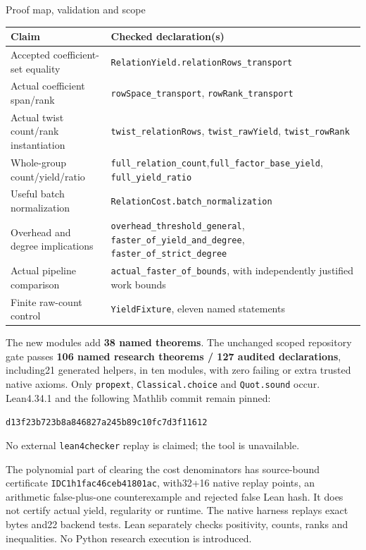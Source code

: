 \documentclass[10pt]{article}
\begin{document}
\newpage
\begin{center}{\Large Proof map, validation and scope}\end{center}
\begin{tabular}{p{.37\linewidth}p{.58\linewidth}}
\toprule
Claim & Checked declaration(s)\\\midrule
Accepted coefficient-set equality & \texttt{RelationYield.relationRows\_transport}\\
Actual coefficient span/rank & \texttt{rowSpace\_transport}, \texttt{rowRank\_transport}\\
Actual twist count/rank instantiation & \texttt{twist\_relationRows}, \texttt{twist\_rawYield}, \texttt{twist\_rowRank}\\
Whole-group count/yield/ratio & \texttt{full\_relation\_count},\newline \texttt{full\_factor\_base\_yield}, \texttt{full\_yield\_ratio}\\
Useful batch normalization & \texttt{RelationCost.batch\_normalization}\\
Overhead and degree implications & \texttt{overhead\_threshold\_general}, \texttt{faster\_of\_yield\_and\_degree}, \texttt{faster\_of\_strict\_degree}\\
Actual pipeline comparison & \texttt{actual\_faster\_of\_bounds}, with independently justified work bounds\\
Finite raw-count control & \texttt{YieldFixture}, eleven named statements\\\bottomrule
\end{tabular}

The new modules add \textbf{38 named theorems}. The unchanged scoped repository
gate passes \textbf{106 named research theorems / 127 audited declarations},
including21 generated helpers, in ten modules, with zero failing or extra
trusted native axioms. Only \texttt{propext}, \texttt{Classical.choice} and
\texttt{Quot.sound} occur. Lean4.34.1 and the following Mathlib commit remain pinned:
\par\texttt{d13f23b723b8a846827a245b89c10fc7d3f11612}\par
No external \texttt{lean4checker} replay is claimed; the tool is unavailable.

The polynomial part of clearing the cost denominators has source-bound
certificate \texttt{IDC1h1fac46ceb41801ac}, with32+16 native replay points,
an arithmetic false-plus-one counterexample and rejected false Lean hash.
It does not certify actual yield, regularity or runtime. The native harness
replays exact bytes and22 backend tests. Lean separately checks positivity,
counts, ranks and inequalities. No Python research execution is introduced.
\end{document}
